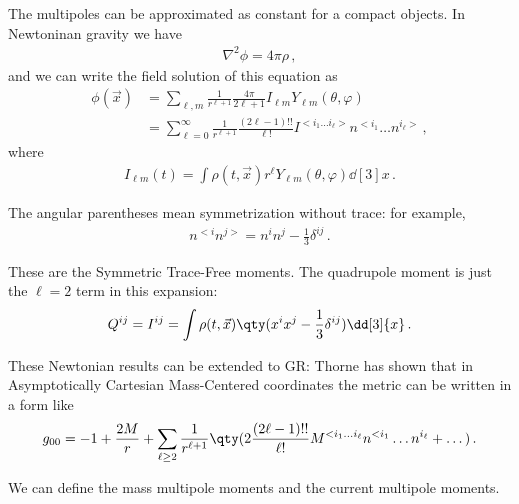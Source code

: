 \documentclass[main.tex]{subfiles}
\begin{document}
The multipoles can be approximated as constant for a compact objects. 
In Newtoninan gravity we have 
%
\begin{align}
\nabla^2 \phi = 4 \pi \rho  
\,,
\end{align}
%
and we can write the field solution of this equation as 
%
\begin{align}
\phi (\vec{x}) &= \sum_{\ell, m} \frac{1}{r^{\ell + 1}} \frac{4 \pi }{2 \ell + 1} I_{\ell m} Y_{\ell m} (\theta , \varphi )   \\
&= \sum _{\ell = 0}^{\infty } \frac{1}{r^{\ell+1}} \frac{(2 \ell-1)!!}{\ell!} I^{<i_1 \dots i_\ell>} n^{<i_1} \dots n^{i_\ell>}
\,,
\end{align}
%
where 
%
\begin{align}
I_{\ell m} (t) = \int \rho (t, \vec{x}) r^{\ell} Y_{\ell m} (\theta , \varphi ) \dd[3]{x}
\,.
\end{align}

The angular parentheses mean symmetrization without trace: for example,
%
\begin{align}
n^{<i} n^{j>} = n^{i} n^{j} - \frac{1}{3} \delta^{ij}
\,.
\end{align}

These are the Symmetric Trace-Free moments.
The quadrupole moment is just the \(\ell=2\) term in this expansion: 
%
\begin{align}
Q^{ij} = I^{ij} = \int \rho (t, \vec{x}) \qty(x^{i} x^{j} - \frac{1}{3} \delta^{ij}) \dd[3]{x}
\,.
\end{align}

These Newtonian results can be extended to GR: Thorne has shown that in Asymptotically Cartesian Mass-Centered coordinates the metric can be written in a form like 
%
\begin{align}
g_{00} =-1 + \frac{2M}{r} + \sum _{\ell\geq2} \frac{1}{r^{\ell+1}}
\qty(
    2 \frac{(2 \ell-1)!!}{\ell!} M^{<i_1 \dots i_\ell} n^{<i_1} \dots n^{i_\ell} + \dots
)
\,.
\end{align}

We can define the mass multipole moments and the current multipole moments.
\end{document}
